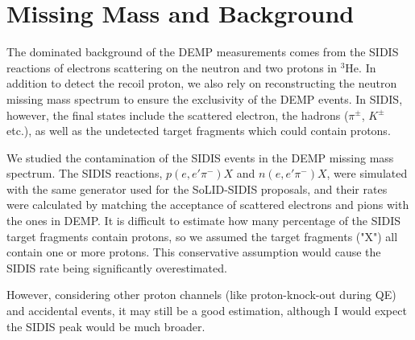 \section{Missing Mass and Background}
The dominated background of the DEMP measurements comes from the SIDIS reactions of electrons scattering on the neutron and two protons in $\mathrm{^{3}He}$. In addition to detect the recoil proton, we also rely on reconstructing the neutron missing mass spectrum to ensure the exclusivity of the DEMP events. In SIDIS, however, the final states include the scattered electron, the hadrons ($\pi^{\pm}$, $K^{\pm}$ etc.), as well as the undetected target fragments which could contain protons. 

We studied the contamination of the SIDIS events in the DEMP missing mass spectrum. The SIDIS reactions, $p(e,e'\pi^{-})X$ and $n(e,e'\pi^{-})X$,  were simulated with the same generator used for the SoLID-SIDIS proposals, and their rates were calculated by matching the acceptance of scattered electrons and pions with the ones in DEMP. It is difficult to estimate how many percentage of the SIDIS target fragments contain protons, so we assumed the target fragments ("X") all contain one or more protons. This conservative assumption would cause the SIDIS rate being significantly overestimated. 

However, considering other proton channels (like proton-knock-out during QE) and accidental events, it may still be a good estimation, although I would expect the SIDIS peak would be much broader.

